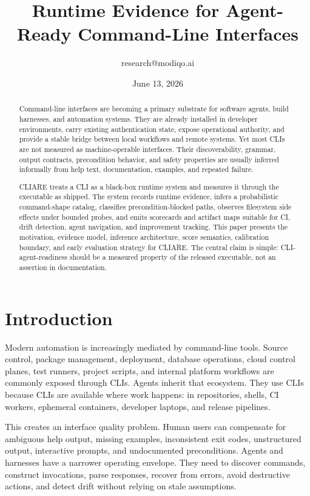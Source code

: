\documentclass[11pt]{article}
\title{Runtime Evidence for Agent-Ready Command-Line Interfaces}
\author{research@modiqo.ai}
\date{June 13, 2026}
\begin{document}
\maketitle

\begin{abstract}
Command-line interfaces are becoming a primary substrate for software agents, build harnesses, and automation systems. They are already installed in developer environments, carry existing authentication state, expose operational authority, and provide a stable bridge between local workflows and remote systems. Yet most CLIs are not measured as machine-operable interfaces. Their discoverability, grammar, output contracts, precondition behavior, and safety properties are usually inferred informally from help text, documentation, examples, and repeated failure.

CLIARE treats a CLI as a black-box runtime system and measures it through the executable as shipped. The system records runtime evidence, infers a probabilistic command-shape catalog, classifies precondition-blocked paths, observes filesystem side effects under bounded probes, and emits scorecards and artifact maps suitable for CI, drift detection, agent navigation, and improvement tracking. This paper presents the motivation, evidence model, inference architecture, score semantics, calibration boundary, and early evaluation strategy for CLIARE. The central claim is simple: CLI-agent-readiness should be a measured property of the released executable, not an assertion in documentation.
\end{abstract}

\section{Introduction}

Modern automation is increasingly mediated by command-line tools. Source control, package management, deployment, database operations, cloud control planes, test runners, project scripts, and internal platform workflows are commonly exposed through CLIs. Agents inherit that ecosystem. They use CLIs because CLIs are available where work happens: in repositories, shells, CI workers, ephemeral containers, developer laptops, and release pipelines.

This creates an interface quality problem. Human users can compensate for ambiguous help output, missing examples, inconsistent exit codes, unstructured output, interactive prompts, and undocumented preconditions. Agents and harnesses have a narrower operating envelope. They need to discover commands, construct invocations, parse responses, recover from errors, avoid destructive actions, and detect drift without relying on stale assumptions.
\end{document}
